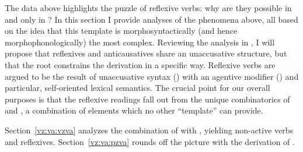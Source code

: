 \begin{exe}
\begin{xlist}
\begin{xlist}
\begin{exe}
\begin{xlist}
\begin{xlist}
\begin{exe}
\begin{xlist}
\begin{xlist}
\begin{exe}
\begin{exe}
\begin{xlist}
\begin{exe}
\begin{exe}
\begin{xlist}
\begin{exe}
\begin{exe}
\begin{exe}
\begin{exe}
\begin{exe}
\begin{xlist}
\begin{exe}
\begin{xlist}
\begin{exe}
\begin{exe}
\begin{xlist}
\begin{exe}
\begin{xlist}
\begin{exe}
\begin{exe}
\begin{exe}
\begin{xlist}
\begin{exe}
\begin{exe}
\begin{exe}
\begin{xlist}
\begin{exe}
\begin{xlist}
\begin{exe}
\begin{xlist}
\begin{exe}
\begin{xlist}
\begin{exe}
\begin{exe}
\begin{exe}
\begin{exe}
\begin{xlist}
\begin{exe}
\begin{xlist}
\begin{exe}
\begin{xlist}
\begin{exe}
\begin{xlist}
\begin{exe}
\begin{xlist}
\begin{exe}
\begin{xlist}
\begin{exe}
\begin{exe}
\begin{exe}
\begin{exe}
\begin{xlist}
\begin{exe}
\begin{xlist}
\begin{exe}
\begin{xlist}
\begin{exe}
\begin{exe}
\begin{xlist}
\begin{exe}
\begin{exe}
\begin{exe}
\begin{exe}
\begin{xlist}
\begin{xlist}
\begin{exe}
\begin{xlist}
\begin{exe}
\begin{exe}
\begin{exe}
\begin{xlist}
\begin{exe}
\begin{exe}
\begin{xlist}
\begin{exe}
\begin{exe}
\begin{exe}
\begin{xlist}
\begin{xlist}
\begin{exe}
\begin{xlist}
\begin{exe}
\begin{exe}
\begin{exe}
The data above highlights the puzzle of reflexive verbs: why are they possible in {\thit} and only in {\thit}? In this section I provide analyses of the phenomena above, all based on the idea that this template is morphosyntactically (and hence morphophonologically) the most complex. Reviewing the analysis in \cite{kastner17gjgl}, I will propose that reflexives and anticausatives share an unaccusative structure, but that the root constrains the derivation in a specific way. Reflexive verbs are argued to be the result of unaccusative syntax (\vz) with an agentive modifier (\va) and particular, self-oriented lexical semantics. The crucial point for our overall purposes is that the reflexive readings fall out from the unique combinatorics of {\vz} and {\va}, a combination of elements which no other ``template'' can provide.

Section~\ref{vz:va:vzva} analyzes the combination of {\va} with {\vz}, yielding non-active verbs and reflexives. Section~\ref{vz:va:pzva} rounds off the picture with the derivation of .


\end{exe}
\end{exe}
\end{exe}
\end{xlist}
\end{exe}
\end{xlist}
\end{xlist}
\end{exe}
\end{exe}
\end{exe}
\end{xlist}
\end{exe}
\end{exe}
\end{xlist}
\end{exe}
\end{exe}
\end{exe}
\end{xlist}
\end{exe}
\end{xlist}
\end{xlist}
\end{exe}
\end{exe}
\end{exe}
\end{exe}
\end{xlist}
\end{exe}
\end{exe}
\end{xlist}
\end{exe}
\end{xlist}
\end{exe}
\end{xlist}
\end{exe}
\end{exe}
\end{exe}
\end{exe}
\end{xlist}
\end{exe}
\end{xlist}
\end{exe}
\end{xlist}
\end{exe}
\end{xlist}
\end{exe}
\end{xlist}
\end{exe}
\end{xlist}
\end{exe}
\end{exe}
\end{exe}
\end{exe}
\end{xlist}
\end{exe}
\end{xlist}
\end{exe}
\end{xlist}
\end{exe}
\end{xlist}
\end{exe}
\end{exe}
\end{exe}
\end{xlist}
\end{exe}
\end{exe}
\end{exe}
\end{xlist}
\end{exe}
\end{xlist}
\end{exe}
\end{exe}
\end{xlist}
\end{exe}
\end{xlist}
\end{exe}
\end{exe}
\end{exe}
\end{exe}
\end{exe}
\end{xlist}
\end{exe}
\end{exe}
\end{xlist}
\end{exe}
\end{exe}
\end{xlist}
\end{xlist}
\end{exe}
\end{xlist}
\end{xlist}
\end{exe}
\end{xlist}
\end{xlist}
\end{exe}
